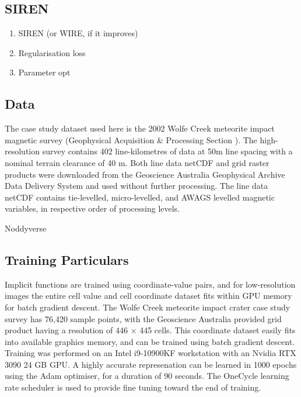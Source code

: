 \documentclass[manuscript.tex]{subfiles}
\begin{document}
\subsection{SIREN}
\begin{enumerate}
    \item{SIREN (or WIRE, if it improves)}
    \item{Regularisation loss}
    \item{Parameter opt}
\end{enumerate}

\subsection{Data}
The case study dataset used here is the 2002 Wolfe Creek meteorite impact magnetic survey (Geophysical Acquisition \& Processing Section \cite*{wolfecreek2019}).
The high-resolution survey contains 402 line-kilometres of data at 50m line spacing with a nominal terrain clearance of 40 m.
Both line data netCDF and grid raster products were downloaded from the Geoscience Australia Geophysical Archive Data Delivery System and used without further processing.
The line data netCDF contains tie-levelled, micro-levelled, and AWAGS levelled magnetic variables, in respective order of processing levels.



Noddyverse


\subsection{Training Particulars}

Implicit functions are trained using coordinate-value pairs, and for low-resolution images the entire cell value and cell coordinate dataset fits within GPU memory for batch gradient descent.
The Wolfe Creek meteorite impact crater case study survey has 76,420 sample points, with the Geoscience Australia provided grid product having a resolution of 446 \(\times\) 445 cells.
This coordinate dataset easily fits into available graphics memory, and can be trained using batch gradient descent.
Training was performed on an Intel i9-10900KF workstation with an Nvidia RTX 3090 24 GB GPU\@.
A highly accurate represenation can be learned in 1000 epochs using the Adam optimiser, for a duration of 90 seconds.
The OneCycle learning rate scheduler \parencite{smithSuperconvergenceVeryFast2018} is used to provide fine tuning toward the end of training.
\end{document}
